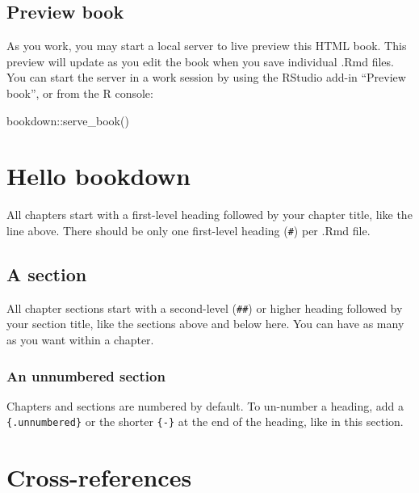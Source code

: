 \documentclass[
]{book}
\newenvironment{Shaded}{\begin{snugshade}}{\end{snugshade}}
\newcommand{\FunctionTok}[1]{\textcolor[rgb]{0.00,0.00,0.00}{#1}}
\newcommand{\NormalTok}[1]{#1}
\newcommand{\SpecialCharTok}[1]{\textcolor[rgb]{0.00,0.00,0.00}{#1}}
\theoremstyle{definition}
\theoremstyle{definition}
\theoremstyle{definition}
\theoremstyle{definition}
\theoremstyle{remark}
\begin{document}
\hypertarget{preview-book}{%
\section{Preview book}\label{preview-book}}

As you work, you may start a local server to live preview this HTML book. This preview will update as you edit the book when you save individual .Rmd files. You can start the server in a work session by using the RStudio add-in ``Preview book'', or from the R console:

\begin{Shaded}
\begin{Highlighting}[]
\NormalTok{bookdown}\SpecialCharTok{::}\FunctionTok{serve\_book}\NormalTok{()}
\end{Highlighting}
\end{Shaded}

\hypertarget{hello-bookdown}{%
\chapter{Hello bookdown}\label{hello-bookdown}}

All chapters start with a first-level heading followed by your chapter title, like the line above. There should be only one first-level heading (\texttt{\#}) per .Rmd file.

\hypertarget{a-section}{%
\section{A section}\label{a-section}}

All chapter sections start with a second-level (\texttt{\#\#}) or higher heading followed by your section title, like the sections above and below here. You can have as many as you want within a chapter.

\hypertarget{an-unnumbered-section}{%
\subsection*{An unnumbered section}\label{an-unnumbered-section}}

Chapters and sections are numbered by default. To un-number a heading, add a \texttt{\{.unnumbered\}} or the shorter \texttt{\{-\}} at the end of the heading, like in this section.

\hypertarget{cross}{%
\chapter{Cross-references}\label{cross}}
\end{document}

